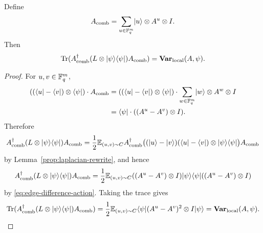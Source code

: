 \begin{lemma}\label{lem:local-rewrite}
	\leanok
	Define
	\[
		A_{\mathrm{comb}} = \sum_{u \in \mathbb{F}_q^m} \lvert u \rangle \otimes A^u \otimes I.
	\]
	Then
	\[
		\operatorname{Tr}(A_{\mathrm{comb}}^\dagger (L \otimes \lvert \psi \rangle\langle \psi \rvert) A_{\mathrm{comb}})
		= \mathbf{Var}_{\mathrm{local}}(A,\psi).
	\]
\end{lemma}
\begin{proof}
	\leanok
	For $u,v \in \mathbb{F}_q^m$,
	\begin{equation}
		\begin{aligned}
			((\langle u \rvert-\langle v \rvert) \otimes \langle \psi \rvert) \cdot A_{\mathrm{comb}}
			 & =
			((\langle u \rvert-\langle v \rvert) \otimes \langle \psi \rvert) \cdot \sum_{w \in \mathbb{F}_q^m} \lvert w \rangle \otimes A^w \otimes I \\
			 & =
			\langle \psi \rvert \cdot ((A^u-A^v)\otimes I).
		\end{aligned}
		\label{eq:edge-difference-action}
	\end{equation}
	Therefore
	\[
		A_{\mathrm{comb}}^\dagger (L \otimes \lvert \psi \rangle\langle \psi \rvert) A_{\mathrm{comb}}
		=
		\frac12 \mathbb{E}_{(u,v)\sim C} A_{\mathrm{comb}}^\dagger \bigl((\lvert u \rangle-\lvert v \rangle)(\langle u \rvert-\langle v \rvert) \otimes \lvert \psi \rangle\langle \psi \rvert\bigr) A_{\mathrm{comb}}
	\]
	by Lemma~\ref{prop:laplacian-rewrite}, and hence
	\[
		A_{\mathrm{comb}}^\dagger (L \otimes \lvert \psi \rangle\langle \psi \rvert) A_{\mathrm{comb}}
		=
		\frac12 \mathbb{E}_{(u,v)\sim C} ((A^u-A^v)\otimes I)\lvert \psi \rangle\langle \psi \rvert((A^u-A^v)\otimes I)
	\]
	by \eqref{eq:edge-difference-action}. Taking the trace gives
	\[
		\operatorname{Tr}(A_{\mathrm{comb}}^\dagger (L \otimes \lvert \psi \rangle\langle \psi \rvert) A_{\mathrm{comb}})
		=
		\frac12 \mathbb{E}_{(u,v)\sim C} \langle \psi \rvert (A^u-A^v)^2 \otimes I \lvert \psi \rangle
		=
		\mathbf{Var}_{\mathrm{local}}(A,\psi).
	\]
\end{proof}

